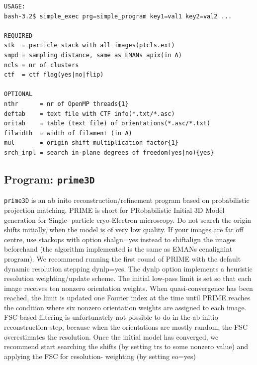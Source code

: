 \documentclass[a4paper,11pt]{article}
\newcommand{\prgname}[1]{\textcolor{NavyBlue}{\texttt{#1}}}
\begin{document}
\begin{verbatim}
USAGE:
bash-3.2$ simple_exec prg=simple_program key1=val1 key2=val2 ...

REQUIRED
stk  = particle stack with all images(ptcls.ext)
smpd = sampling distance, same as EMANs apix(in A)
ncls = nr of clusters
ctf  = ctf flag(yes|no|flip)

OPTIONAL
nthr      = nr of OpenMP threads{1}
deftab    = text file with CTF info(*.txt/*.asc)
oritab    = table (text file) of orientations(*.asc/*.txt)
filwidth  = width of filament (in A)
mul       = origin shift multiplication factor{1}
srch_inpl = search in-plane degrees of freedom(yes|no){yes}
\end{verbatim}

\subsection{Program: \prgname{prime3D}}
\label{prime3D}
\prgname{prime3D} is an ab inito reconstruction/refinement program based on probabilistic projection matching. PRIME is short for PRobabilistic Initial 3D Model generation for Single- particle cryo-Electron microscopy. Do not search the origin shifts initially, when the model is of very low quality. If your images are far off centre, use stackops with option shalgn=yes instead to shiftalign the images beforehand (the algorithm implemented is the same as EMANs cenalignint program). We recommend running the first round of PRIME with the default dynamic resolution stepping dynlp=yes. The dynlp option implements a heuristic resolution weighting/update scheme. The initial low-pass limit is set so that each image receives ten nonzero orientation weights. When quasi-convergence has been reached, the limit is updated one Fourier index at the time until PRIME reaches the condition where six nonzero orientation weights are assigned to each image. FSC-based filtering is unfortunately not possible to do in the ab initio reconstruction step, because when the orientations are mostly random, the FSC overestimates the resolution. Once the initial model has converged, we recommend start searching the shifts (by setting trs to some nonzero value) and applying the FSC for resolution- weighting (by setting eo=yes)
\end{document}
